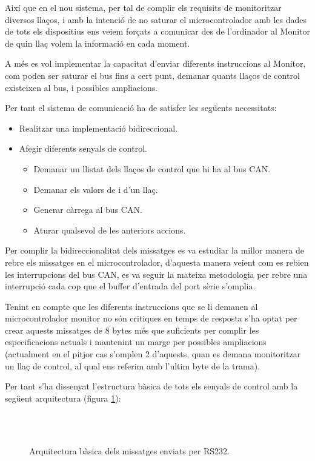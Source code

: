 Així que en el nou sistema, per tal de complir els requisits de monitoritzar diversos llaços, i amb la intenció de no saturar el microcontrolador amb les dades de tots els dispositius ens veiem forçats a comunicar des de l'ordinador al Monitor de quin llaç volem la informació en cada moment.

A més es vol implementar la capacitat d'enviar diferents instruccions al Monitor, com poden ser saturar el bus fins a cert punt, demanar quants llaços de control existeixen al bus, i possibles ampliacions.

Per tant el sistema de comunicació ha de satisfer les següents necessitats:

\begin{itemize}
	\item Realitzar una implementació bidireccional.
	\item Afegir diferents senyals de control.
		\begin{itemize}
			\item Demanar un llistat dels llaços de control que hi ha al bus CAN.
			\item Demanar els valors de \SensorActuador i \Controlador d'un llaç.
			\item Generar càrrega al bus CAN.
			\item Aturar qualsevol de les anteriors accions.
		\end{itemize}
\end{itemize}



Per complir la bidireccionalitat dels missatges es va estudiar la millor manera de rebre els missatges en el microcontrolador, d'aquesta manera veient com es rebien les interrupcions del bus CAN, es va seguir la mateixa metodologia per rebre una interrupció cada cop que el buffer d'entrada del port sèrie s'omplia.

Tenint en compte que les diferents instruccions que se li demanen al microcontrolador monitor no són critiques en temps de resposta s'ha optat per crear aquests missatges de 8 bytes més que suficients per complir les especificacions actuals i mantenint un marge per possibles ampliacions (actualment en el pitjor cas s'omplen 2 d'aquests, quan es demana monitoritzar un llaç de control, al qual ens referim amb l'ultim byte de la trama).

Per tant s'ha dissenyat l'estructura bàsica de tots els senyals de control amb la següent arquitectura (figura \ref{fig:bit_encoding:general}):

\begin{figure}[ht!]
	\begin{bytefield}[bitwidth=\linewidth/8]{8}
		  \\
	     \\
	     
	\end{bytefield}
    \caption{Arquitectura bàsica dels missatges enviats per RS232.}
    \label{fig:bit_encoding:general}
\end{figure}

